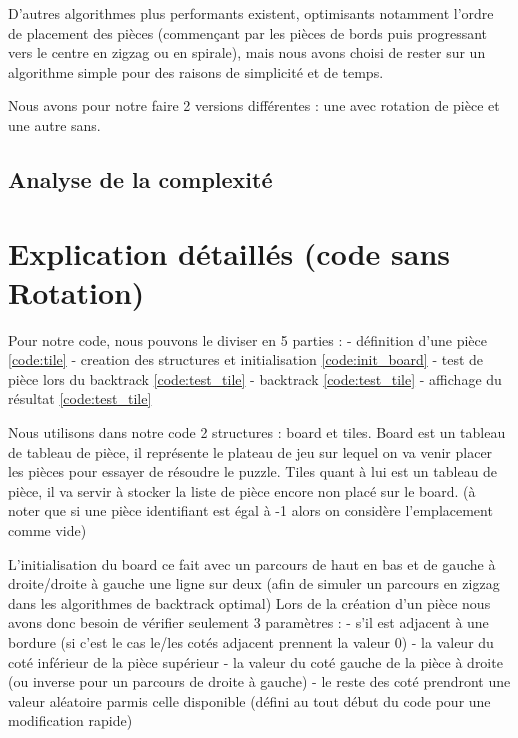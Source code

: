 \documentclass[12pt, openany]{report}
\begin{document}
D'autres algorithmes plus performants existent, optimisants notamment
l'ordre de placement des pièces (commençant par les pièces de bords
puis progressant vers le centre en zigzag ou en spirale), mais nous
avons choisi de rester sur un algorithme simple pour des raisons de
simplicité et de temps.

Nous avons pour notre faire 2 versions différentes : une avec rotation de pièce et une autre sans.

\subsection*{Analyse de la complexité}


\section*{Explication détaillés (code sans Rotation)}

Pour notre code, nous pouvons le diviser en 5 parties : 
- définition d'une pièce \ref{code:tile}
- creation des structures et initialisation \ref{code:init_board} 
- test de pièce lors du backtrack \ref{code:test_tile} 
- backtrack \ref{code:test_tile} 
- affichage du résultat \ref{code:test_tile} 

 

Nous utilisons dans notre code 2 structures : board et tiles.
Board est un tableau de tableau de pièce, il représente le plateau de jeu sur lequel on va venir placer les pièces pour essayer de résoudre le puzzle. 
Tiles quant à lui est un tableau de pièce, il va servir à stocker la liste de pièce encore non placé sur le board.
(à noter que si une pièce identifiant est égal à -1 alors on considère l'emplacement comme vide)

L'initialisation du board ce fait avec un parcours de haut en bas et de gauche à droite/droite à gauche une ligne sur deux (afin de simuler un parcours en zigzag dans les algorithmes de backtrack optimal)
Lors de la création d'un pièce nous avons donc besoin de vérifier seulement 3 paramètres : 
- s'il est adjacent à une bordure (si c'est le cas le/les cotés adjacent prennent la valeur 0)
- la valeur du coté inférieur de la pièce supérieur
- la valeur du coté gauche de la pièce à droite (ou inverse pour un parcours de droite à gauche)
- le reste des coté prendront une valeur aléatoire parmis celle disponible (défini au tout début du code pour une modification rapide)
 
\end{document}
